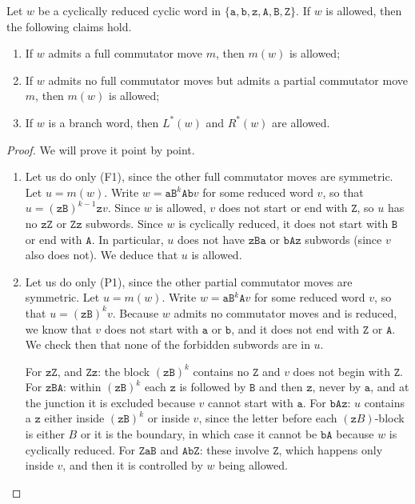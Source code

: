 \documentclass{article}
\begin{document}
	\begin{proposition}
		Let $w$ be a cyclically reduced cyclic word in $\{\mathtt{a},\mathtt{b},\mathtt{z},\mathtt{A},\mathtt{B},\mathtt{Z}\}$.
		If $w$ is allowed, then the following claims hold.
		\begin{enumerate}
			\item If $w$ admits a full commutator move $m$, then $m(w)$ is allowed;
			\item If $w$ admits no full commutator moves but admits a partial commutator move $m$, then $m(w)$ is allowed;
			\item If $w$ is a branch word, then $L^*(w)$ and $R^*(w)$ are allowed.
		\end{enumerate}
	\end{proposition}
	\begin{proof}\leavevmode We will prove it point by point.
		\begin{enumerate}
			\item Let us do only (F1), since the other full commutator moves are symmetric.
			Let $u=m(w)$.
			Write $w=\mathtt{aB}^k\mathtt{A b} v$ for some reduced word $v$, so that $u=(\mathtt{zB})^{k-1}\mathtt{z}v$.
			Since $w$ is allowed, $v$ does not start or end with $\mathtt{Z}$, so $u$ has no $\mathtt{zZ}$ or $\mathtt{Z z}$ subwords.
			Since $w$ is cyclically reduced, it does not start with $\mathtt{B}$ or end with $\mathtt{A}$.
			In particular, $u$ does not have $\mathtt{zB a}$ or $\mathtt{bA z}$ subwords (since $v$ also does not).
			We deduce that $u$ is allowed.
			\item Let us do only (P1), since the other partial commutator moves are symmetric.
			Let $u=m(w)$.
			Write $w=\mathtt{aB}^k\mathtt{A} v$ for some reduced word $v$, so that $u=(\mathtt{zB})^k v$.
			Because $w$ admits no commutator moves and is reduced, we know that $v$ does not start with $\mathtt{a}$ or $\mathtt{b}$, and it does not end with $\mathtt{Z}$ or $\mathtt{A}$. We check then that none of the forbidden subwords are in $u$.
			
			For $\mathtt{zZ}$, and $\mathtt{Zz}$: the block $(\mathtt{zB})^k$ contains no $\mathtt{Z}$ and $v$ does not begin with $\mathtt{Z}$. For $\mathtt{zBA}$: within $(\mathtt{zB})^k$ each $\mathtt{z}$ is followed by $\mathtt{B}$ and then $\mathtt{z}$, never by $\mathtt{a}$, and at the junction it is excluded because $v$ cannot start with $\mathtt{a}$. For $\mathtt{bAz}$: $u$ contains a $\mathtt{z}$ either inside $(\mathtt{zB})^k$ or inside $v$, since the letter before each $(\mathtt{z}B)$-block is either $B$ or it is the boundary, in which case it cannot be $\mathtt{bA}$ because $w$ is cyclically reduced. For $\mathtt{ZaB}$ and $\mathtt{AbZ}$: these involve $\mathtt{Z}$, which happens only inside $v$, and then it is controlled by $w$ being allowed.
			

\end{enumerate}
\end{proof}
\end{document}
